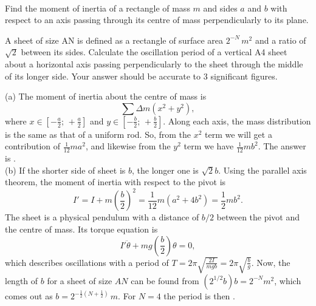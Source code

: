 \documentclass[../TST.tex]{subfiles}
\begin{document}
\begin{pproblem}{\ }
\begin{subpart}
	\item Find the moment of inertia of a rectangle of mass $m$ and sides $a$ and $b$ with respect to an axis passing through its centre of mass perpendicularly to its plane. 
	\item A sheet of size AN is defined as a rectangle of surface area $2^{-N}\,\unit{m^2}$ and a ratio of $\sqrt{2}$ between its sides. Calculate the oscillation period of a vertical A4 sheet about a horizontal axis passing perpendicularly to the sheet through the middle of its longer side. Your answer should be accurate to 3 significant figures. 
\end{subpart}
\end{pproblem}

\ifprob \else
\begin{solution} (a) The moment of inertia about the centre of mass is 
\begin{equation*}
\sum \Delta m(x^2+y^2),
\end{equation*}
where $x\in\left[-\frac{a}{2};\,+\frac{a}{2}\right]$ and $y\in\left[-\frac{b}{2};\,+\frac{b}{2}\right]$. Along each axis, the mass distribution is the same as that of a uniform rod. So, from the $x^2$ term we will get a contribution of $\frac{1}{12}ma^2$, and likewise from the $y^2$ term we have $\frac{1}{12}mb^2$. The answer is .\\

(b) If the shorter side of sheet is $b$, the longer one is $\sqrt{2}b$. Using the parallel axis theorem, the moment of inertia with respect to the pivot is
\begin{equation*}
I'=I+m\left(\frac{b}{2}\right)^2=\frac{1}{12}m \left(a^2+4b^2\right) = \frac{1}{2}mb^2.
\end{equation*}
The sheet is a physical pendulum with a distance of $b/2$ between the pivot and the centre of mass. Its torque equation is
\begin{equation*}
	I'\ddot{\theta}+mg\left(\frac{b}{2}\right)\theta=0,
\end{equation*}
which describes oscillations with a period of $T=2\pi\sqrt{\frac{2I}{mgb}}=2\pi\sqrt{\frac{b}{g}}$.
Now, the length of $b$ for a sheet of size $AN$ can be found from $(2^{1/2}b)b=2^{-N}\unit{m^2}$, which comes out as $b=2^{-\frac{1}{2}\left(N+\frac{1}{2}\right)}\,\unit{m}$. For $N=4$ the period is then .
\end{solution}
\fi
\end{document}
